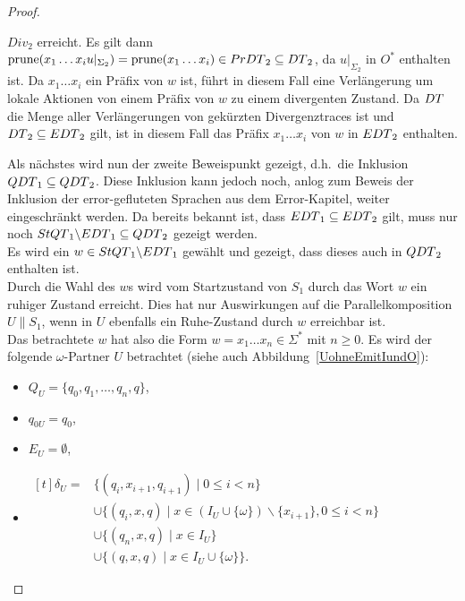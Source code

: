 \begin{proof}
\begin{itemize}
\begin{itemize}
          $Div_2$ erreicht. Es gilt dann $\mathrm{prune}{}(x_1\dots x_iu|_{\Sigma
          _2}) = \mathrm{prune}{}(x_1\dots x_i)\in PrDT{}_2\subseteq DT{}_2$, da
          $u|_{\Sigma _2}$ in $O^*$ enthalten ist. Da $x_1\dots x_i$ ein Präfix
          von $w$ ist, führt in diesem Fall eine Verlängerung um lokale
          Aktionen von einem Präfix von $w$ zu einem divergenten Zustand. Da
          $DT$ die Menge aller Verlängerungen von gekürzten Divergenztraces
          ist und $DT{}_2\subseteq EDT{}_2$ gilt, ist in diesem Fall das
          Präfix $x_1\dots x_i$ von $w$ in $EDT{}_2$ enthalten.
      \end{itemize}
  \end{itemize}

  Als nächstes wird nun der zweite Beweispunkt gezeigt, d.h.\ die Inklusion
  $QDT{}_1\subseteq QDT{}_2$. Diese Inklusion kann jedoch noch, anlog zum
  Beweis der Inklusion der error-gefluteten Sprachen aus dem Error-Kapitel,
  weiter eingeschränkt werden. Da bereits bekannt ist, dass $EDT{}_1\subseteq
  EDT{}_2$ gilt, muss nur noch $StQT{}_1\backslash EDT{}_1\subseteq
  QDT{}_2$ gezeigt werden.\\
  Es wird ein $w\in StQT{}_1\backslash EDT{}_1$ gewählt und gezeigt, dass
  dieses auch in $QDT{}_2$ enthalten ist.\\
  Durch die Wahl des $w$s wird vom Startzustand von $S_1$ durch das Wort $w$
  ein ruhiger Zustand erreicht. Dies hat nur Auswirkungen auf die
  Parallelkomposition $U\|S_1$, wenn in $U$ ebenfalls ein Ruhe-Zustand durch
  $w$ erreichbar ist.\\
  Das betrachtete $w$ hat also die Form $w=x_1\dots x_n\in \Sigma ^*$ mit
  $n\geq 0$. Es wird der folgende $\omega$-Partner $U$ betrachtet (siehe auch
  Abbildung~\ref{UohneEmitIundO}):
  \begin{itemize}
    \item $Q_U=\{q_0,q_1,\dots ,q_n, q\}$,
    \item $q_{0U}=q_0$,
    \item $E_U=\emptyset$,
    \item $\begin{aligned}[t]
        \delta _U=&\{(q_i,x_{i+1},q_{i+1})\mid  0\leq i< n\}\\
                  &\cup\{(q_i,x,q)\mid  x\in (I_U\cup
      \{\omega\})\backslash\{x_{i+1}\}, 0\leq i< n\}\\
                  &\cup\{(q_n,x,q)\mid x\in I_U\}\\
                  &\cup\{(q,x,q)\mid x\in I_U\cup\{\omega\}\}.
    \end{aligned}$
  \end{itemize}
  \begin{figure} [h!tbp]
  \begin{center}
\end{center}
\end{figure}
\end{proof}
